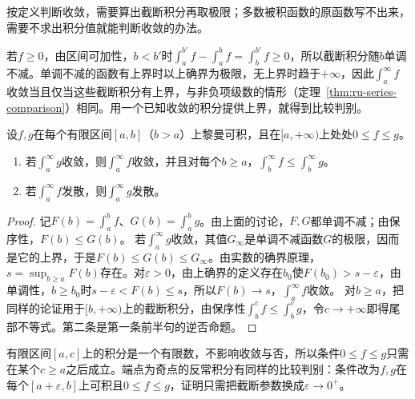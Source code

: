按定义判断收敛，需要算出截断积分再取极限；多数被积函数的原函数写不出来，需要不求出积分值就能判断收敛的办法。

若$f\geq0$，由区间可加性，$b<b'$时$\int_a^{b'}f-\int_a^bf=\int_b^{b'}f\geq0$，所以截断积分随$b$单调不减。单调不减的函数有上界时以上确界为极限，无上界时趋于$+\infty$，因此$\int_a^\infty f$收敛当且仅当这些截断积分有上界，与非负项级数的情形（定理~\ref{thm:ru-series-comparison}）相同。用一个已知收敛的积分提供上界，就得到比较判别。
\begin{theorem}[反常积分的比较判别]
\label{thm:ru-improper-comparison}
设$f,g$在每个有限区间$[a,b]$（$b>a$）上黎曼可积，且在$[a,+\infty)$上处处$0\leq f\leq g$。
\begin{enumerate}
 \item 若$\int_a^\infty g$收敛，则$\int_a^\infty f$收敛，并且对每个$b\geq a$，$\int_b^\infty f\leq\int_b^\infty g$。
 \item 若$\int_a^\infty f$发散，则$\int_a^\infty g$发散。
\end{enumerate}
\end{theorem}
\begin{proof}
记$F(b)=\int_a^bf$、$G(b)=\int_a^bg$。由上面的讨论，$F,G$都单调不减；由保序性，$F(b)\leq G(b)$。
若$\int_a^\infty g$收敛，其值$G_\infty$是单调不减函数$G$的极限，因而是它的上界，于是$F(b)\leq G(b)\leq G_\infty$。由实数的确界原理，$s=\sup_{b\geq a}F(b)$存在。对$\varepsilon>0$，由上确界的定义存在$b_0$使$F(b_0)>s-\varepsilon$，由单调性，$b\geq b_0$时$s-\varepsilon<F(b)\leq s$，所以$F(b)\to s$，$\int_a^\infty f$收敛。
对$b\geq a$，把同样的论证用于$[b,+\infty)$上的截断积分，由保序性$\int_b^cf\leq\int_b^cg$，令$c\to+\infty$即得尾部不等式。第二条是第一条前半句的逆否命题。
\end{proof}
有限区间$[a,c]$上的积分是一个有限数，不影响收敛与否，所以条件$0\leq f\leq g$只需在某个$c\geq a$之后成立。端点为奇点的反常积分有同样的比较判别：条件改为$f,g$在每个$[a+\varepsilon,b]$上可积且$0\leq f\leq g$，证明只需把截断参数换成$\varepsilon\to0^+$。

